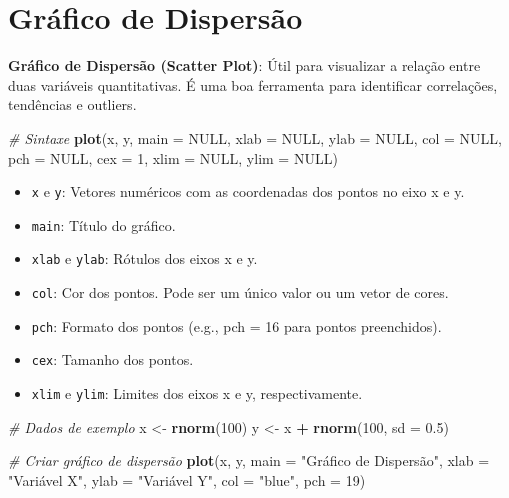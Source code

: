 \documentclass[
]{book}
\newenvironment{Shaded}{\begin{snugshade}}{\end{snugshade}}
\newcommand{\AttributeTok}[1]{\textcolor[rgb]{0.13,0.29,0.53}{#1}}
\newcommand{\CommentTok}[1]{\textcolor[rgb]{0.56,0.35,0.01}{\textit{#1}}}
\newcommand{\ConstantTok}[1]{\textcolor[rgb]{0.56,0.35,0.01}{#1}}
\newcommand{\DecValTok}[1]{\textcolor[rgb]{0.00,0.00,0.81}{#1}}
\newcommand{\FloatTok}[1]{\textcolor[rgb]{0.00,0.00,0.81}{#1}}
\newcommand{\FunctionTok}[1]{\textcolor[rgb]{0.13,0.29,0.53}{\textbf{#1}}}
\newcommand{\NormalTok}[1]{#1}
\newcommand{\OtherTok}[1]{\textcolor[rgb]{0.56,0.35,0.01}{#1}}
\newcommand{\SpecialCharTok}[1]{\textcolor[rgb]{0.81,0.36,0.00}{\textbf{#1}}}
\newcommand{\StringTok}[1]{\textcolor[rgb]{0.31,0.60,0.02}{#1}}
\providecommand{\tightlist}{%
  \setlength{\itemsep}{0pt}\setlength{\parskip}{0pt}}
\begin{document}
\section{Gráfico de Dispersão}\label{gruxe1fico-de-dispersuxe3o}

\textbf{Gráfico de Dispersão (Scatter Plot)}: Útil para visualizar a relação
entre duas variáveis quantitativas. É uma boa ferramenta para
identificar correlações, tendências e outliers.

\begin{Shaded}
\begin{Highlighting}[]
\CommentTok{\# Sintaxe}
\FunctionTok{plot}\NormalTok{(x, y, }
     \AttributeTok{main =} \ConstantTok{NULL}\NormalTok{, }
     \AttributeTok{xlab =} \ConstantTok{NULL}\NormalTok{, }
     \AttributeTok{ylab =} \ConstantTok{NULL}\NormalTok{, }
     \AttributeTok{col =} \ConstantTok{NULL}\NormalTok{, }
     \AttributeTok{pch =} \ConstantTok{NULL}\NormalTok{, }
     \AttributeTok{cex =} \DecValTok{1}\NormalTok{, }
     \AttributeTok{xlim =} \ConstantTok{NULL}\NormalTok{, }
     \AttributeTok{ylim =} \ConstantTok{NULL}\NormalTok{)}
\end{Highlighting}
\end{Shaded}

\begin{itemize}
\tightlist
\item
  \texttt{x} e \texttt{y}: Vetores numéricos com as coordenadas dos pontos no eixo x e y.
\item
  \texttt{main}: Título do gráfico.
\item
  \texttt{xlab} e \texttt{ylab}: Rótulos dos eixos x e y.
\item
  \texttt{col}: Cor dos pontos. Pode ser um único valor ou um vetor de cores.
\item
  \texttt{pch}: Formato dos pontos (e.g., pch = 16 para pontos preenchidos).
\item
  \texttt{cex}: Tamanho dos pontos.
\item
  \texttt{xlim} e \texttt{ylim}: Limites dos eixos x e y, respectivamente.
\end{itemize}

\begin{Shaded}
\begin{Highlighting}[]
\CommentTok{\# Dados de exemplo}
\NormalTok{x }\OtherTok{\textless{}{-}} \FunctionTok{rnorm}\NormalTok{(}\DecValTok{100}\NormalTok{)}
\NormalTok{y }\OtherTok{\textless{}{-}}\NormalTok{ x }\SpecialCharTok{+} \FunctionTok{rnorm}\NormalTok{(}\DecValTok{100}\NormalTok{, }\AttributeTok{sd =} \FloatTok{0.5}\NormalTok{)}

\CommentTok{\# Criar gráfico de dispersão}
\FunctionTok{plot}\NormalTok{(x, y, }
     \AttributeTok{main =} \StringTok{"Gráfico de Dispersão"}\NormalTok{, }
     \AttributeTok{xlab =} \StringTok{"Variável X"}\NormalTok{, }
     \AttributeTok{ylab =} \StringTok{"Variável Y"}\NormalTok{, }
     \AttributeTok{col =} \StringTok{"blue"}\NormalTok{, }
     \AttributeTok{pch =} \DecValTok{19}\NormalTok{)}
\end{Highlighting}
\end{Shaded}
\end{document}
